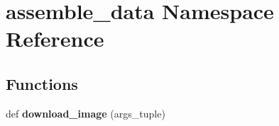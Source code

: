 \hypertarget{namespaceassemble__data}{}\section{assemble\+\_\+data Namespace Reference}
\label{namespaceassemble__data}
\subsection*{Functions}
\begin{DoxyCompactItemize}
\item 
\mbox{\label{namespaceassemble__data_a5daa2e1e853de5f778f0e21cddf484be}} 
def {\bfseries download\+\_\+image} (args\+\_\+tuple)
\end{DoxyCompactItemize}
